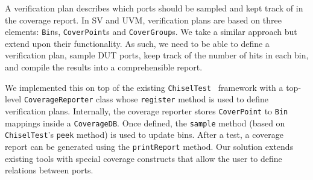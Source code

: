 \documentclass[conference]{IEEEtran}
\begin{document}
A verification plan describes which ports should be sampled and kept track of in the coverage report. In SV and UVM, verification plans are based on three elements: \texttt{Bin}s, \texttt{CoverPoint}s and \texttt{CoverGroup}s. We take a similar approach but extend upon their functionality. As such, we need to be able to %
define a verification plan, %
sample DUT ports, %
keep track of the number of hits in each bin, %
and compile the results into a comprehensible report.%

We implemented this on top of the existing \texttt{ChiselTest}~\cite{chisel:tester2} framework with a top-level \texttt{CoverageReporter} class whose \texttt{register} method is used to define verification plans. Internally, the coverage reporter stores \texttt{CoverPoint} to \texttt{Bin} mappings inside a \texttt{CoverageDB}. Once defined, the \texttt{sample} method (based on \texttt{ChiselTest}'s \texttt{peek} method) is used to update bins. After a test, a coverage report can be generated using the \texttt{printReport} method. Our solution extends existing tools with special coverage constructs that allow the user to define relations between ports. %
\end{document}
